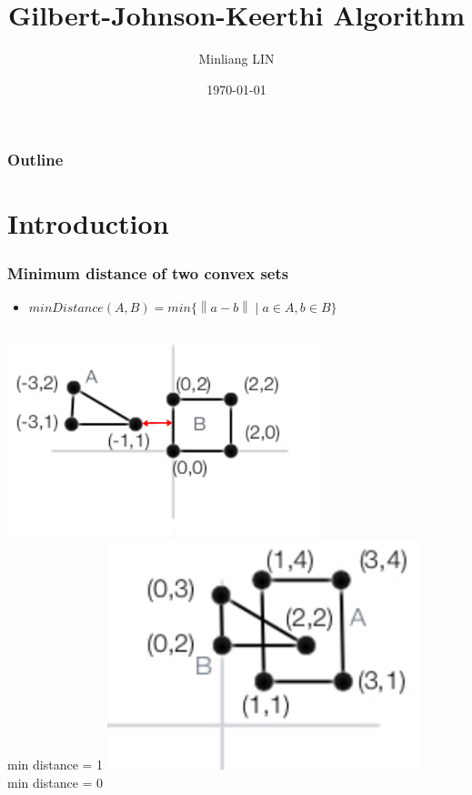 \documentclass{beamer}
\title[GJK]{Gilbert-Johnson-Keerthi Algorithm}
\author{Minliang LIN}
\date{\today}
\newcommand{\norm}[1]{\left\lVert#1\right\rVert}
\begin{document}
\everymath{\displaystyle}

\begin{frame}
  \titlepage
\end{frame}

\begin{frame}
  \frametitle{Outline}
  \tableofcontents
\end{frame}

\section{Introduction}
\begin{frame}
\frametitle{Minimum distance of two convex sets}
  \begin{itemize}
    \item $ minDistance(A, B) = min\{\norm{a - b} \mid a\in A, b\in B\}$
  \end{itemize}
  \begin{columns}
    \centering
    \includegraphics[width=0.7\textwidth]{images/g1}\\
    min distance = 1
    \centering
    \includegraphics[width=0.7\textwidth]{images/g2}\\
    min distance = 0
  \end{columns}
\end{frame}
\end{document}
